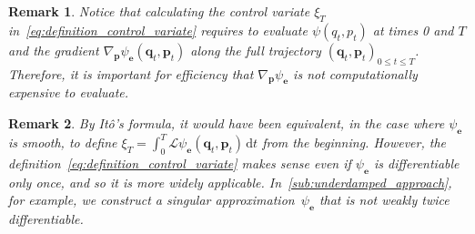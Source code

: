 \documentclass[11pt,a4paper]{article}
\newcommand{\grad}{\nabla}
\newcommand{\vect}[1]{\boldsymbol{\mathbf #1}}
\renewcommand{\d}{\mathrm d}
\theoremstyle{plain}
\newtheorem{remark}{Remark}[section]
\numberwithin{equation}{section}
\renewcommand{\leq}{\leqslant}
\begin{document}
\begin{remark}
    \label{remark:cost_control_variate}
    Notice that calculating the control variate $\xi_T$ in~\eqref{eq:definition_control_variate} requires
    to evaluate $\psi(q_t, p_t)$ at times 0 and $T$ and the gradient $\grad_{\vect p} \psi_{\vect e}(\vect q_t, \vect p_t)$ along the full trajectory $(\vect q_t, \vect p_t)_{0\leq t\leq T}$.
    Therefore, it is important for efficiency that $\grad_{\vect p} \psi_{\vect e}$ is not computationally expensive to evaluate.
\end{remark}

\begin{remark}
    By It\^o's formula,
    it would have been equivalent, in the case where $\psi_{\vect e}$ is smooth,
    to define
    \(
        \xi_T = \int_{0}^{T} \mathcal L \psi_{\vect e}(\vect q_t, \vect p_t) \, \d t
    \)
    from the beginning.
    However, the definition~\eqref{eq:definition_control_variate} makes sense even if $\psi_{\vect e}$ is differentiable only once,
    and so it is more widely applicable.
    In~\cref{sub:underdamped_approach}, for example, we construct a singular approximation~$\psi_{\vect e}$ that is not weakly twice differentiable.
\end{remark}
\end{document}
